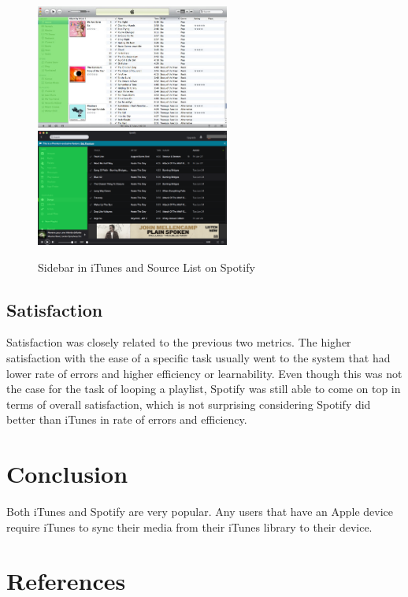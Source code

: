 \documentclass[11pt]{article}
\begin{document}
\begin{figure}[H] %
   \centering
   \includegraphics[width=2.5in]{iTunes10_sidebar.jpg}
   \includegraphics[width=2.5in]{spotify_mac_sidebar.png}
   \caption{Sidebar in iTunes and Source List on Spotify}                                    
   \label{fig:iTunes10_and_spotify}
\end{figure}

\subsection{Satisfaction}
Satisfaction was closely related to the previous two metrics. The higher satisfaction with the ease of a specific task usually went to the system that had lower rate of errors and higher efficiency or learnability. Even though this was not the case for the task of looping a playlist, Spotify was still able to come on top in terms of overall satisfaction, which is not surprising considering Spotify did better than iTunes in rate of errors and efficiency.

\section{Conclusion}
Both iTunes and Spotify are very popular. Any users that have an Apple device require iTunes to sync their media from their iTunes library to their device. %

\section{References}

\end{document}
